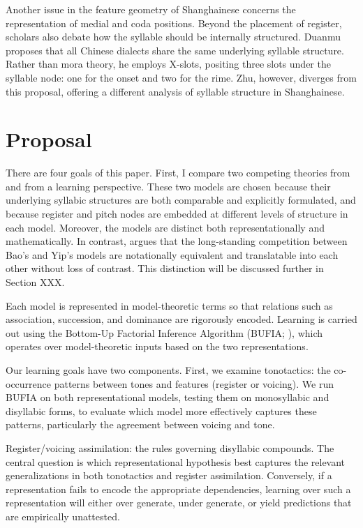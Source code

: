 \documentclass[11pt]{article}
\begin{document}
Another issue in the feature geometry of Shanghainese concerns the 
representation of medial and coda positions. Beyond the placement of register, 
scholars also debate how the syllable should be internally structured. Duanmu 
proposes that all Chinese dialects share the same underlying syllable 
structure. Rather than mora theory, he employs X-slots, positing three slots 
under the syllable node: one for the onset and two for the rime. Zhu, however, 
diverges from this proposal, offering a different analysis of syllable 
structure in Shanghainese.

\section{Proposal}
There are four goals of this paper. First, I compare two competing theories 
from \citet{duanmu1988} and \citet{zhu1999shanghai} from a learning perspective. 
These two models are chosen because their underlying syllabic structures are 
both comparable and explicitly formulated, and because register and pitch nodes 
are embedded at different levels of structure in each model. Moreover, the models 
are distinct both representationally and mathematically. In contrast, 
\citet{oakdenNotationalEquivalenceTonal2020} argues that the long-standing competition 
between Bao’s and Yip’s models are notationally equivalent and translatable into each 
other without loss of contrast. This distinction will be discussed further in Section XXX.

Each model is represented in model-theoretic terms so that relations such as association, 
succession, and dominance are rigorously encoded. Learning is carried out using the Bottom-Up 
Factorial Inference Algorithm (BUFIA; \citet{chandleeBufia2019}), which operates over model-theoretic 
inputs based on the two representations.

Our learning goals have two components. First, we examine tonotactics: the co-occurrence 
patterns between tones and features (register or voicing). We run BUFIA on both representational models, testing them on monosyllabic and disyllabic forms, to evaluate which model more effectively captures these patterns, particularly the agreement between voicing and tone.

Register/voicing assimilation: the rules governing disyllabic compounds.
The central question is which representational hypothesis best captures the relevant generalizations in both tonotactics and register assimilation. Conversely, if a representation fails to encode the appropriate dependencies, learning over such a representation will either over generate, under generate, or yield predictions that are empirically unattested.
\end{document}
